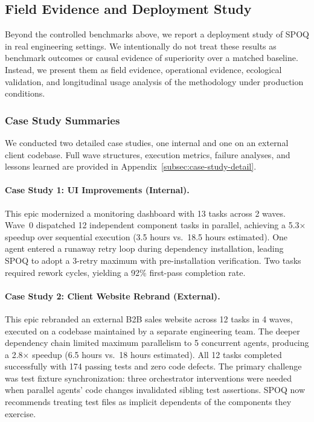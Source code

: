 \subsection{Field Evidence and Deployment Study}

Beyond the controlled benchmarks above, we report a deployment study of SPOQ in real engineering settings. We intentionally do not treat these results as benchmark outcomes or causal evidence of superiority over a matched baseline. Instead, we present them as field evidence, operational evidence, ecological validation, and longitudinal usage analysis of the methodology under production conditions.

\subsubsection{Case Study Summaries}
\label{subsec:case-studies}

We conducted two detailed case studies, one internal and one on an external
client codebase. Full wave structures, execution metrics, failure analyses,
and lessons learned are provided in Appendix~\ref{subsec:case-study-detail}.

\paragraph{Case Study 1: UI Improvements (Internal).}
This epic modernized a monitoring dashboard with 13 tasks across 2 waves.
Wave~0 dispatched 12 independent component tasks in parallel, achieving a
5.3$\times$ speedup over sequential execution (3.5 hours vs.\ 18.5 hours
estimated). One agent entered a runaway retry loop during dependency
installation, leading SPOQ to adopt a 3-retry maximum with pre-installation
verification. Two tasks required rework cycles, yielding a 92\% first-pass
completion rate.

\paragraph{Case Study 2: Client Website Rebrand (External).}
This epic rebranded an external B2B sales website across 12 tasks in 4 waves,
executed on a codebase maintained by a separate engineering team. The deeper
dependency chain limited maximum parallelism to 5 concurrent agents, producing
a 2.8$\times$ speedup (6.5 hours vs.\ 18 hours estimated). All 12 tasks
completed successfully with 174 passing tests and zero code defects. The
primary challenge was test fixture synchronization: three orchestrator
interventions were needed when parallel agents' code changes invalidated
sibling test assertions. SPOQ now recommends treating test files as implicit
dependents of the components they exercise.

